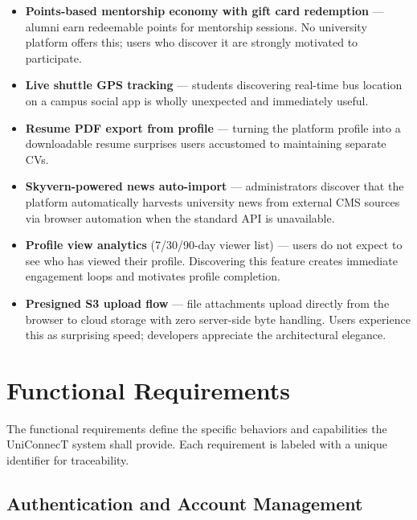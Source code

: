 \documentclass[12pt, a4paper]{article}
\begin{document}
\begin{itemize}
    \item \textbf{Points-based mentorship economy with gift card redemption} --- alumni
    earn redeemable points for mentorship sessions. No university platform offers this;
    users who discover it are strongly motivated to participate.
    \item \textbf{Live shuttle GPS tracking} --- students discovering real-time bus
    location on a campus social app is wholly unexpected and immediately useful.
    \item \textbf{Resume PDF export from profile} --- turning the platform profile
    into a downloadable resume surprises users accustomed to maintaining separate CVs.
    \item \textbf{Skyvern-powered news auto-import} --- administrators discover that
    the platform automatically harvests university news from external CMS sources via
    browser automation when the standard API is unavailable.
    \item \textbf{Profile view analytics} (7/30/90-day viewer list) --- users do not
    expect to see who has viewed their profile. Discovering this feature creates
    immediate engagement loops and motivates profile completion.
    \item \textbf{Presigned S3 upload flow} --- file attachments upload directly from
    the browser to cloud storage with zero server-side byte handling. Users experience
    this as surprising speed; developers appreciate the architectural elegance.
\end{itemize}
\clearpage
\section{Functional Requirements}

The functional requirements define the specific behaviors and capabilities the
UniConnecT system shall provide. Each requirement is labeled with a unique identifier
for traceability.

\subsection{Authentication and Account Management}
\end{document}
